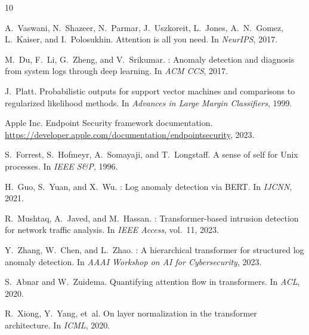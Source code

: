 \documentclass[letterpaper,twocolumn,10pt]{article}
\begin{document}
\begin{thebibliography}{10}

A.~Vaswani, N.~Shazeer, N.~Parmar, J.~Uszkoreit, L.~Jones,
A.~N.~Gomez, L.~Kaiser, and I.~Polosukhin.
\newblock Attention is all you need.
\newblock In {\em NeurIPS}, 2017.

M.~Du, F.~Li, G.~Zheng, and V.~Srikumar.
: Anomaly detection and diagnosis from system logs
through deep learning.
\newblock In {\em ACM CCS}, 2017.

J.~Platt.
\newblock Probabilistic outputs for support vector machines and
comparisons to regularized likelihood methods.
\newblock In {\em Advances in Large Margin Classifiers}, 1999.

Apple Inc.
\newblock Endpoint Security framework documentation.
\newblock \url{https://developer.apple.com/documentation/endpointsecurity},
2023.

S.~Forrest, S.~Hofmeyr, A.~Somayaji, and T.~Longstaff.
\newblock A sense of self for {Unix} processes.
\newblock In {\em IEEE S\&P}, 1996.

H.~Guo, S.~Yuan, and X.~Wu.
: Log anomaly detection via {BERT}.
\newblock In {\em IJCNN}, 2021.

R.~Mushtaq, A.~Javed, and M.~Hassan.
: Transformer-based intrusion detection for
network traffic analysis.
\newblock In {\em IEEE Access}, vol.~11, 2023.

Y.~Zhang, W.~Chen, and L.~Zhao.
: A hierarchical transformer for structured
log anomaly detection.
\newblock In {\em AAAI Workshop on AI for Cybersecurity}, 2023.

S.~Abnar and W.~Zuidema.
\newblock Quantifying attention flow in transformers.
\newblock In {\em ACL}, 2020.

R.~Xiong, Y.~Yang, et~al.
\newblock On layer normalization in the transformer architecture.
\newblock In {\em ICML}, 2020.
\end{thebibliography}
\end{document}
